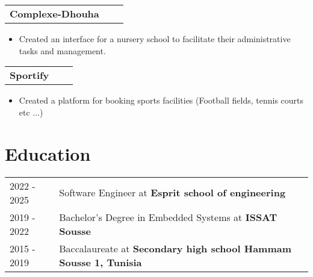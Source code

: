 \documentclass[a4paper,11pt]{article}
\makeatletter
\newenvironment{jobshort}[2]
    {
    \begin{tabularx}{\linewidth}{@{}l X r@{}}
    \textbf{#1} & \hfill &  #2 \\[2.75pt]
    \end{tabularx}
    \begin{minipage}[t]{\linewidth}
    \begin{itemize}[nosep,after=\strut, leftmargin=1em, itemsep=2pt]
    }
    {
    \end{itemize}
    \end{minipage}
    }
\makeatother
\begin{document}
\begin{jobshort}{Complexe-Dhouha}{}
\item Created an interface for a nursery school to facilitate their administrative tasks and management.
\end{jobshort}

\vspace{-8pt}

\begin{jobshort}{Sportify}{}
\item Created a platform for booking sports facilities (Football fields, tennis courts etc ...)
\end{jobshort}

\section{Education}
\begin{tabularx}{\linewidth}{@{}l X@{}}	
2022 - 2025 & Software Engineer at \textbf{Esprit school of engineering} \\

2019 - 2022 & Bachelor's Degree in Embedded Systems at \textbf{ISSAT Sousse} \\ 

2015 - 2019 &  Baccalaureate at \textbf{Secondary high school Hammam Sousse 1, Tunisia} \\
\end{tabularx}


\end{document}

